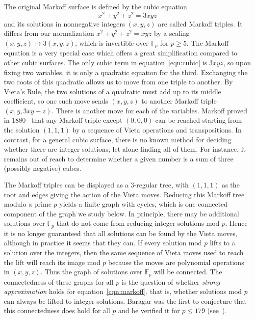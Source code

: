 \documentclass[10pt]{amsart}
\theoremstyle{definition}\newtheorem{defi}[theo]{Definition}\newtheorem{rema}[theo]{Remark}\newtheorem{exam}[theo]{Example}\newtheorem{exem}[theo]{Example}\newtheorem{nota}[theo]{Notation}
\newcommand{\F}{\mathbb{F}}
\begin{document}
The original Markoff surface is defined by the cubic equation
\begin{equation}\label{eqn:cubic}
x^2+y^2+z^2=3xyz
\end{equation}
and its solutions in nonnegative integers $(x,y,z)$ are called Markoff triples. It differs from our normalization $x^2+y^2+z^2 = xyz$ by a scaling $(x,y,z) \mapsto 3(x,y,z)$, which is invertible over $\F_p$ for $p \geq 5$. The Markoff equation is a very special case which offers a great simplification compared to other cubic surfaces. The only cubic term in equation~\eqref{eqn:cubic} is $3xyz$, so upon fixing two variables, it is only a quadratic equation for the third. Exchanging the two roots of this quadratic allows us to move from one triple to another. By Vieta's Rule, the two solutions of a quadratic must add up to its middle coefficient, so one such move sends $(x,y,z)$ to another Markoff triple $(x,y,3xy -z)$. There is another move for each of the variables. Markoff proved in 1880~\cite{Mark} that any Markoff triple except $(0,0,0)$ can be reached starting from the solution $(1,1,1)$ by a sequence of Vieta operations and transpositions. In contrast, for a general cubic surface, there is no known method for deciding whether there are integer solutions, let alone finding all of them. For instance, it remains out of reach to determine whether a given number is a sum of three (possibly negative) cubes.


The Markoff triples can be displayed as a $3$-regular tree, with $(1,1,1)$ as the root and edges giving the action of the Vieta moves. Reducing this Markoff tree modulo a prime $p$ yields a finite graph with cycles, which is one connected component of the graph we study below. In principle, there may be additional solutions over $\F_p$ that do not come from reducing integer solutions mod $p$. Hence it is no longer guaranteed that all solutions can be found by the Vieta moves, although in practice it seems that they can. If every solution mod $p$ lifts to a solution over the integers, then the same sequence of Vieta moves used to reach the lift will reach its image mod $p$ because the moves are polynomial operations in $(x,y,z)$. Thus the graph of solutions over $\F_p$ will be connected. The connectedness of these graphs for all $p$ is the question of whether \emph{strong approximation} holds for equation~\eqref{eqn:markoff}, that is, whether solutions mod $p$ can always be lifted to integer solutions. Baragar was the first to conjecture that this connectedness does hold for all $p$ and he verified it for $p \leq 179$ (see~\cite[p.~124]{Bar}).
\end{document}
